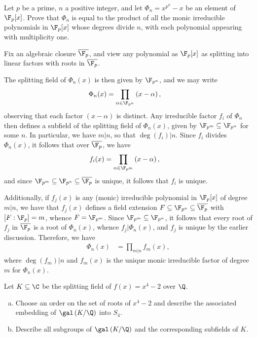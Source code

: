 \documentclass[10pt]{mypackage}
\begin{document}
\RaggedRight
\begin{problem}[Problem 1]
  Let $p$ be a prime, $n$ a positive integer, and let $\Phi_n = x^{p^{n}}-x$ be an element of $\F_p[x]$. Prove that $\Phi_n$ is equal to the product of all the monic irreducible polynomials in $\F_p[x]$ whose degrees divide $n$, with each polynomial appearing with multiplicity one.
\end{problem}
\begin{solution}
  Fix an algebraic closure $ \overline{\F_p} $, and view any polynomial as $\F_p[x]$ as splitting into linear factors with roots in $ \overline{\F_p} $.

  The splitting field of $\Phi_n(x)$ is then given by $\F_{p^{n}}$, and we may write
  \begin{align*}
    \Phi_n(x) &= \prod_{\alpha\in \F_{p^{n}}} \left( x-\alpha \right),
  \end{align*}
  observing that each factor $\left( x-\alpha \right)$ is distinct. Any irreducible factor $f_i$ of $\Phi_n$ then defines a subfield of the splitting field of $\Phi_n(x)$, given by $\F_{p^{m}}\subseteq \F_{p^{n}}$ for some $n$. In particular, we have $m | n$, so that $\deg\left( f_i \right) | n$. Since $f_i$ divides $\Phi_n(x)$, it follows that over $ \overline{\F_p} $, we have
  \begin{align*}
    f_i(x) &= \prod_{\alpha\in \F_{p^{m}}} \left( x-\alpha \right),
  \end{align*}
  and since $\F_{p^{m}}\subseteq \F_{p^{n}}\subseteq \overline{\F_p}$ is unique, it follows that $f_i$ is unique.

  Additionally, if $f_j(x)$ is any (monic) irreducible polynomial in $\F_p[x]$ of degree $m | n$, we have that $f_j(x)$ defines a field extension $F\subseteq \F_{p^{n}}\subseteq \overline{\F_p}$ with $\left[ F:\F_p \right] = m$, whence $F = \F_{p^{m}}$. Since $\F_{p^{m}}\subseteq \F_{p^{n}}$, it follows that every root of $f_j$ in $ \overline{\F_p} $ is a root of $ \Phi_n(x) $, whence $f_j | \Phi_n(x)$, and $f_j$ is unique by the earlier discussion. Therefore, we have
  \begin{align*}
    \Phi_n(x) &= \prod_{m | n} f_m(x),
  \end{align*}
  where $\deg\left( f_m \right) | n$ and $f_m(x)$ is the unique monic irreducible factor of degree $m$ for $\Phi_n(x)$.
\end{solution}
\begin{problem}[Problem 2]
  Let $K\subseteq \C$ be the splitting field of $f(x) = x^4-2$ over $\Q$.
  \begin{enumerate}[(a)]
    \item Choose an order on the set of roots of $x^{4}-2$ and describe the associated embedding of $\gal\left( K/\Q \right)$ into $S_4$.
    \item Describe all subgroups of $\gal\left( K/\Q \right)$ and the corresponding subfields of $K$.
  \end{enumerate}
\end{problem}
\end{document}
